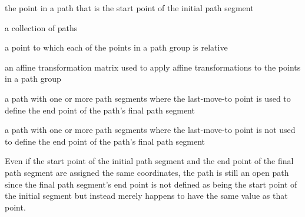the point in a path that is the start point of the initial path segment

a collection of paths

a point to which each of the points in a path group is relative

an affine transformation matrix used to apply affine transformations to the points in a path group

a path with one or more path segments where the last-move-to point is used to define the end point of the path's final path segment

a path with one or more path segments where the last-move-to point is not used to define the end point of the path's final path segment
\begin{note}
Even if the start point of the initial path segment and the end point of the final path segment are assigned the same coordinates, the path is still an open path since the final path segment's end point is not defined as being the start point of the initial segment but instead merely happens to have the same value as that point.
\end{note}
%
